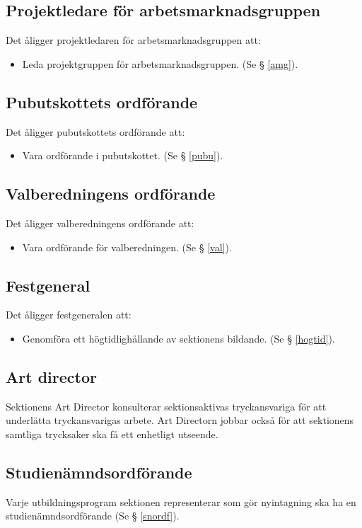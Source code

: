 \documentclass{datateknologsektionen-document}
\begin{document}
\subsection{Projektledare för arbetsmarknadsgruppen}
Det åligger projektledaren för arbetsmarknadsgruppen att:
\begin{itemize}
  \item Leda projektgruppen för arbetsmarknadsgruppen. (Se § \ref{amg}).
\end{itemize}
\subsection{Pubutskottets ordförande}
Det åligger pubutskottets ordförande att:
\begin{itemize}
  \item Vara ordförande i pubutskottet. (Se § \ref{pubu}).
\end{itemize}

\subsection{Valberedningens ordförande}
\label{valordforande}
Det åligger valberedningens ordförande att:
\begin{itemize}
  \item Vara ordförande för valberedningen. (Se § \ref{val}).
\end{itemize}
\subsection{Festgeneral}
Det åligger festgeneralen att:
\begin{itemize}
  \item Genomföra ett högtidlighållande av sektionens bildande. (Se § \ref{hogtid}).
\end{itemize}
\subsection{Art director}
\label{ad}
Sektionens Art Director konsulterar sektionsaktivas tryckansvariga för att underlätta
tryckansvarigas arbete. Art Directorn jobbar också för att sektionens samtliga trycksaker ska få ett
enhetligt utseende.
\subsection{Studienämndsordförande}
Varje utbildningsprogram sektionen representerar som gör nyintagning ska ha en
studienämndsordförande (Se § \ref{snordf}).
\end{document}
